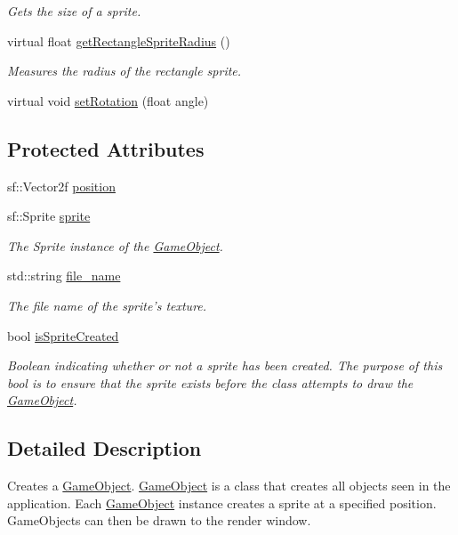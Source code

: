\begin{DoxyCompactItemize}
\begin{DoxyCompactList}\small\item\em Gets the size of a sprite. \end{DoxyCompactList}\item 
virtual float \hyperlink{class_game_object_a8220201988f2aaea8a6f748872e188a9}{get\+Rectangle\+Sprite\+Radius} ()
\begin{DoxyCompactList}\small\item\em Measures the radius of the rectangle sprite. \end{DoxyCompactList}\item 
virtual void \hyperlink{class_game_object_a320a94559557834d53bffa538d8349c9}{set\+Rotation} (float angle)
\end{DoxyCompactItemize}
\subsection*{Protected Attributes}
\begin{DoxyCompactItemize}
\item 
sf\+::\+Vector2f \hyperlink{class_game_object_a86e4253e3734436b4a5a0c503e0033b4}{position}
\item 
sf\+::\+Sprite \hyperlink{class_game_object_abb3608f1c76edd590e023585c2216f02}{sprite}
\begin{DoxyCompactList}\small\item\em The Sprite instance of the \hyperlink{class_game_object}{Game\+Object}. \end{DoxyCompactList}\item 
std\+::string \hyperlink{class_game_object_a1b725daa9c79833a7139469468dc770a}{file\+\_\+name}
\begin{DoxyCompactList}\small\item\em The file name of the sprite's texture. \end{DoxyCompactList}\item 
bool \hyperlink{class_game_object_a677286bcb906871b6a3eb0c0b9342176}{is\+Sprite\+Created}
\begin{DoxyCompactList}\small\item\em Boolean indicating whether or not a sprite has been created. The purpose of this bool is to ensure that the sprite exists before the class attempts to draw the \hyperlink{class_game_object}{Game\+Object}. \end{DoxyCompactList}\end{DoxyCompactItemize}


\subsection{Detailed Description}
Creates a \hyperlink{class_game_object}{Game\+Object}. \hyperlink{class_game_object}{Game\+Object} is a class that creates all objects seen in the application. Each \hyperlink{class_game_object}{Game\+Object} instance creates a sprite at a specified position. Game\+Objects can then be drawn to the render window. 

